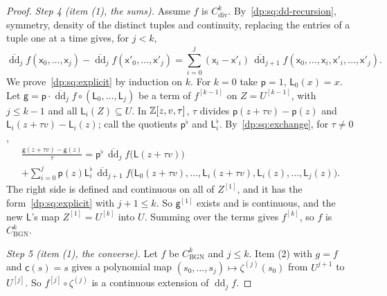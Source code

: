 \begin{proof}
\emph{Step 4 (item (1), the sums).} Assume $f$ is $C^k_{\mathrm{div}}$. By~\eqref{dp:sq:dd-recursion}, symmetry, density of the distinct tuples and continuity, replacing the entries of a tuple one at a time gives, for $j<k$,
\begin{equation}\label{dp:sq:exchange}
 \overline{\operatorname{dd}}_jf(\mathsf x_0,\dots,\mathsf x_j)-\overline{\operatorname{dd}}_jf(\mathsf x'_0,\dots,\mathsf x'_j)=\sum_{i=0}^j(\mathsf x_i-\mathsf x'_i)\,\overline{\operatorname{dd}}_{j+1}f(\mathsf x_0,\dots,\mathsf x_i,\mathsf x'_i,\dots,\mathsf x'_j).
\end{equation}
We prove~\eqref{dp:sq:explicit} by induction on $k$. For $k=0$ take $\mathsf p=1$, $\mathsf L_0(x)=x$. Let $\mathsf g=\mathsf p\cdot\overline{\operatorname{dd}}_jf\circ(\mathsf L_0,\dots,\mathsf L_j)$ be a term of $f^{[k-1]}$ on $Z=U^{[k-1]}$, with $j\le k-1$ and all $\mathsf L_i(Z)\subseteq U$. In $\mathbb Z[z,v,\tau]$, $\tau$ divides $\mathsf p(z+\tau v)-\mathsf p(z)$ and $\mathsf L_i(z+\tau v)-\mathsf L_i(z)$; call the quotients $\mathsf p^\flat$ and $\mathsf L_i^\flat$. By~\eqref{dp:sq:exchange}, for $\tau\ne0$,
\begin{multline*}
 \frac{\mathsf g(z+\tau v)-\mathsf g(z)}\tau=\mathsf p^\flat\,\overline{\operatorname{dd}}_jf\bigl(\mathsf L(z+\tau v)\bigr)\\
 +\sum_{i=0}^j\mathsf p(z)\mathsf L_i^\flat\,\overline{\operatorname{dd}}_{j+1}f\bigl(\mathsf L_0(z+\tau v),\dots,\mathsf L_i(z+\tau v),\mathsf L_i(z),\dots,\mathsf L_j(z)\bigr).
\end{multline*}
The right side is defined and continuous on all of $Z^{[1]}$, and it has the form~\eqref{dp:sq:explicit} with $j+1\le k$. So $\mathsf g^{[1]}$ exists and is continuous, and the new $\mathsf L$'s map $Z^{[1]}=U^{[k]}$ into $U$. Summing over the terms gives $f^{[k]}$, so $f$ is $C^k_{\mathrm{BGN}}$.

\emph{Step 5 (item (1), the converse).} Let $f$ be $C^k_{\mathrm{BGN}}$ and $j\le k$. Item (2) with $g=f$ and $\mathsf c(s)=s$ gives a polynomial map $(s_0,\dots,s_j)\mapsto\zeta^{(j)}(s_0)$ from $U^{j+1}$ to $U^{[j]}$. So $f^{[j]}\circ\zeta^{(j)}$ is a continuous extension of $\operatorname{dd}_jf$.
\end{proof}
